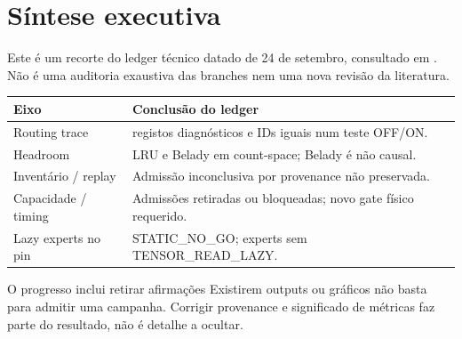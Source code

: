 \section{Síntese executiva}
Este é um recorte do ledger técnico datado de 24 de setembro, consultado em . Não é uma auditoria exaustiva das branches nem uma nova revisão da literatura. 


\begin{tabularx}{\linewidth}{@{}p{38mm}Y@{}}
\toprule \textbf{Eixo} & \textbf{Conclusão do ledger}\\ \midrule
Routing trace &  registos diagnósticos e  IDs iguais num teste OFF/ON.\\
Headroom & LRU e Belady em count-space; Belady é não causal.\\
Inventário / replay & Admissão inconclusiva por provenance não preservada.\\
Capacidade / timing & Admissões retiradas ou bloqueadas; novo gate físico requerido.\\
Lazy experts no pin & STATIC\_NO\_GO; experts sem TENSOR\_READ\_LAZY.\\
\bottomrule
\end{tabularx}

\begin{FindingBox}{O progresso inclui retirar afirmações}
Existirem outputs ou gráficos não basta para admitir uma campanha. Corrigir provenance e significado de métricas faz parte do resultado, não é detalhe a ocultar.
\end{FindingBox}
